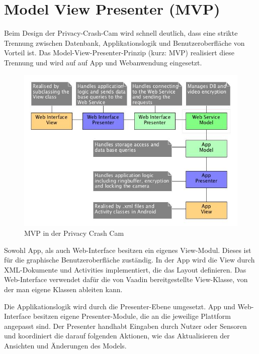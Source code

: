 \section{Model View Presenter (MVP)} \label{allg:MVP}

Beim Design der Privacy-Crash-Cam wird schnell deutlich, dass eine strikte Trennung zwischen Datenbank, Applikationslogik und Benutzeroberfläche von Vorteil ist. Das Model-View-Presenter-Prinzip (kurz: MVP) realisiert diese Trennung und wird auf auf App und Webanwendung eingesetzt.\newline\par

\begin{figure}[ht]
	\centering
\includegraphics[width=1\textwidth]{./resources/Diagramme/overview_mvp.jpg}
\caption{MVP in der Privacy Crash Cam}
	\label{fig:overview_mvp}
\end{figure}

Sowohl App, als auch Web-Interface besitzen ein eigenes View-Modul. Dieses ist für die graphische Benutzeroberfläche zuständig. In der App wird die View durch XML-Dokumente und Activities implementiert, die das Layout definieren. Das Web-Interface verwendet dafür die von Vaadin bereitgestellte View-Klasse, von der man eigene Klassen ableiten kann.\newline\par

Die Applikationslogik wird durch die Presenter-Ebene umgesetzt. App und Web-Interface besitzen eigene Presenter-Module, die an die jeweilige Plattform angepasst sind. Der Presenter handhabt Eingaben durch Nutzer oder Sensoren und koordiniert die darauf folgenden Aktionen, wie das Aktualisieren der Ansichten und Änderungen des Models.\newline\par

